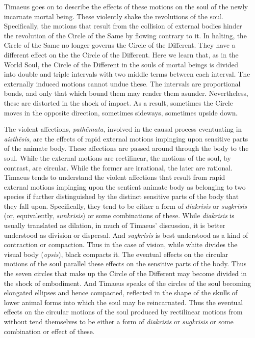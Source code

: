 Timaeus goes on to describe the effects of these motions on the soul of the newly incarnate mortal being. These violently shake the revolutions of the soul. Specifically, the motions that result from the collision of external bodies hinder the revolution of the Circle of the Same by flowing contrary to it. In halting, the Circle of the Same no longer governs the Circle of the Different. They have a different effect on the the Circle of the Different. Here we learn that, as in the World Soul, the Circle of the Different in the souls of mortal beings is divided into double and triple intervals with two middle terms between each interval. The externally induced motions cannot undue these. The intervals are proportional bonds, and only that which bound them may render them asunder. Nevertheless, these are distorted in the shock of impact. As a result, sometimes the Circle moves in the opposite direction, sometimes sideways, sometimes upside down. 

The violent affections, \emph{pathēmata}, involved in the causal process eventuating in \emph{aisthēsis}, are the effects of rapid external motions impinging upon sensitive parts of the animate body. These affections are passed around through the body to the soul. While the external motions are rectilinear, the motions of the soul, by contrast, are circular. While the former are irrational, the later are rational. Timaeus tends to understand the violent affections that result from rapid external motions impinging upon the sentient animate body as belonging to two species if further distinguished by the distinct sensitive parts of the body that they fall upon. Specifically, they tend to be either a form of \emph{diakrisis} or \emph{sugkrisis} (or, equivalently, \emph{sunkrisis}) or some combinations of these. While \emph{diakrisis} is usually translated as dilation, in much of Timaeus' discussion, it is better understood as division or dispersal. And \emph{sugkrisis} is best understood as a kind of contraction or compaction. Thus in the case of vision, while white divides the visual body (\emph{opsis}), black compacts it. The eventual effects on the circular motions of the soul parallel these effects on the sensitive parts of the body. Thus the seven circles that make up the Circle of the Different may become divided in the shock of embodiment. And Timaeus speaks of the circles of the soul becoming elongated ellipses and hence compacted, reflected in the shape of the skulls of lower animal forms into which the soul may be reincarnated. Thus the eventual effects on the circular motions of the soul produced by rectilinear motions from without tend themselves to be either a form of \emph{diakrisis} or \emph{sugkrisis} or some combination or effect of these.

